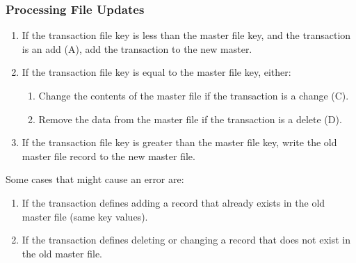 \documentclass[\main/notes.tex]{subfiles}
\begin{document}
				\subsubsection{Processing File Updates}
					\begin{enumerate}[nosep]
						\item If the transaction file key is less than the master file key, and the transaction is an add (A), add the transaction to the new master.
						\item If the transaction file key is equal to the master file key, either:
						\begin{enumerate}[nosep]
							\item Change the contents of the master file if the transaction is a change (C).
							\item Remove the data from the master file if the transaction is a delete (D).
						\end{enumerate}
						\item If the transaction file key is greater than the master file key, write the old master file record to the new master file.
					\end{enumerate}
					Some cases that might cause an error are:
					\begin{enumerate}[nosep]
						\item If the transaction defines adding a record that already exists in the old master file (same key values).
						\item If the transaction defines deleting or changing a record that does not exist in the old master file.
					\end{enumerate}
\end{document}
